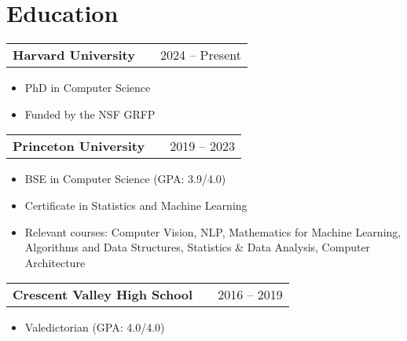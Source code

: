 \documentclass[a4paper,12pt]{article}
\makeatletter
\newenvironment{joblong}[2]
    {
    \begin{tabularx}{\linewidth}{@{}l X r@{}}
    \textbf{#1} & \hfill &  #2 \\[3.75pt]
    \end{tabularx}
    \begin{minipage}[t]{\linewidth}
    \begin{itemize}[nosep,after=\strut, leftmargin=2em, itemsep=3pt,label=--]
    }
    {
    \end{itemize}
    \end{minipage}    
    }
\makeatother
\begin{document}
\section{Education}
\begin{adjustwidth}{0.7em}{0pt}

\begin{joblong}{Harvard University}{2024 – Present}
\item PhD in Computer Science
\item Funded by the NSF GRFP
\end{joblong}

\vspace{-3pt}
\begin{joblong}{Princeton University}{2019 – 2023}
\item BSE in Computer Science (GPA: 3.9/4.0)
\item Certificate in Statistics and Machine Learning
\item Relevant courses: Computer Vision, NLP, Mathematics for Machine Learning, \newline Algorithms and Data Structures, Statistics \& Data Analysis, Computer Architecture
\end{joblong}

\vspace{-3pt}
\begin{joblong}{Crescent Valley High School}{2016 – 2019}
\item Valedictorian (GPA: 4.0/4.0)
\end{joblong}




\end{adjustwidth}
\end{document}
